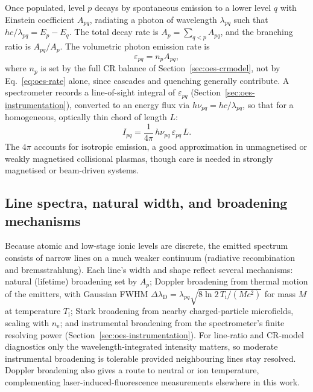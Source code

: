 Once populated, level $p$ decays by spontaneous emission to a lower level $q$ with Einstein coefficient $A_{pq}$, radiating a photon of wavelength $\lambda_{pq}$ such that $hc/\lambda_{pq}=E_{p}-E_{q}$. The total decay rate is $A_{p}=\sum_{q<p}A_{pq}$, and the branching ratio is $A_{pq}/A_{p}$. The volumetric photon emission rate is
\begin{equation}
\varepsilon_{pq} = n_{p} A_{pq},
\label{eq:oes-emissivity}
\end{equation}
where $n_{p}$ is set by the full CR balance of Section~\ref{sec:oes-crmodel}, not by Eq.~\eqref{eq:oes-rate} alone, since cascades and quenching generally contribute. A spectrometer records a line-of-sight integral of $\varepsilon_{pq}$ (Section~\ref{sec:oes-instrumentation}), converted to an energy flux via $h\nu_{pq}=hc/\lambda_{pq}$, so that for a homogeneous, optically thin chord of length $L$:
\begin{equation}
I_{pq} = \frac{1}{4\pi}\, h\nu_{pq}\, \varepsilon_{pq}\, L .
\label{eq:oes-intensity}
\end{equation}
The $4\pi$ accounts for isotropic emission, a good approximation in unmagnetised or weakly magnetised collisional plasmas, though care is needed in strongly magnetised or beam-driven systems.

\subsection{Line spectra, natural width, and broadening mechanisms}

Because atomic and low-stage ionic levels are discrete, the emitted spectrum consists of narrow lines on a much weaker continuum (radiative recombination and bremsstrahlung). Each line's width and shape reflect several mechanisms: natural (lifetime) broadening set by $A_{p}$; Doppler broadening from thermal motion of the emitters, with Gaussian FWHM $\Delta\lambda_{\mathrm{D}} = \lambda_{pq}\sqrt{8\ln 2\, T_{\mathrm{i}}/(Mc^{2})}$ for mass $M$ at temperature $T_{\mathrm{i}}$; Stark broadening from nearby charged-particle microfields, scaling with $n_{\mathrm{e}}$; and instrumental broadening from the spectrometer's finite resolving power (Section~\ref{sec:oes-instrumentation}). For line-ratio and CR-model diagnostics only the wavelength-integrated intensity matters, so moderate instrumental broadening is tolerable provided neighbouring lines stay resolved. Doppler broadening also gives a route to neutral or ion temperature, complementing laser-induced-fluorescence measurements elsewhere in this work.

